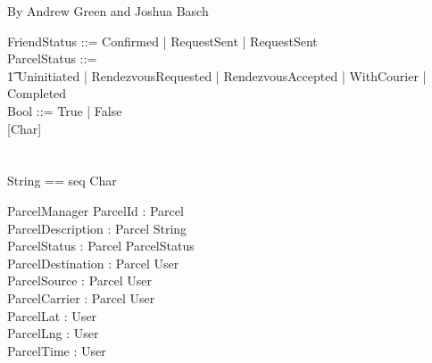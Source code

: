 \documentclass{article}
\begin{document}
By Andrew Green and Joshua Basch\\

\begin{zed}
	FriendStatus ::= Confirmed | RequestSent | RequestSent\\
	ParcelStatus ::= \\
	\t1 Uninitiated | RendezvousRequested | RendezvousAccepted | WithCourier | Completed \\
	Bool ::= True | False\\
	
[Char]\\
[User]\\
[Parcel]\\
String == seq Char\\
\end{zed}


\begin{schema}{ParcelManager}
	ParcelId : Parcel \mapsto \nat\\
	ParcelDescription : Parcel \mapsto String\\
	ParcelStatus : Parcel \mapsto ParcelStatus\\
	ParcelDestination : Parcel \mapsto User\\
	ParcelSource : Parcel \mapsto User\\
	ParcelCarrier : Parcel \mapsto User\\
	ParcelLat : User \mapsto \real\\
	ParcelLng : User \mapsto \real\\
	ParcelTime : User \mapsto \nat\\
	\where
\end{schema}
\end{document}
